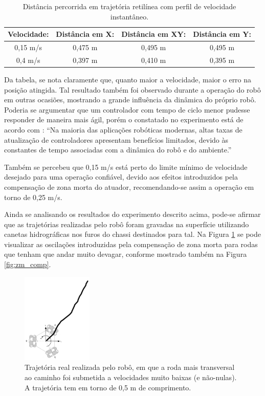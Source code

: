 \begin{table}
  \caption{Distância percorrida em trajetória retilínea com perfil de velocidade instantâneo.}
  \begin{tabular}{||c c c c||}
    \hline
     \textbf{Velocidade:} & \textbf{Distância em X:} & \textbf{Distância em XY:} & \textbf{Distância em Y:} \\ \hline\hline
     0,15 m/s        & 0,475 m    &  0,495 m     & 0,495 m    \\ \hline
     0,4 m/s         & 0,397 m    &  0,410 m     & 0,395 m    \\ \hline
  \end{tabular}
  \label{tab:spd}
\end{table}

Da tabela, se nota claramente que, quanto maior a velocidade, maior o erro na posição atingida. Tal resultado também foi observado durante a operação do robô em outras ocasiões, mostrando a grande influência da dinâmica do próprio robô. Poderia se argumentar que um controlador com tempo de ciclo menor pudesse responder de maneira mais ágil, porém o constatado no experimento está de acordo com \citet{lynch2017modern}: ``Na maioria das aplicações robóticas modernas, altas taxas de atualização de controladores apresentam benefícios limitados, devido às constantes de tempo associadas com a dinâmica do robô e do ambiente.''

Também se percebeu que 0,15 m/s está perto do limite mínimo de velocidade desejado para uma operação confiável, devido aos efeitos introduzidos pela compensação de zona morta do atuador, recomendando-se assim a operação em torno de 0,25 m/s.

Ainda se analisando os resultados do experimento descrito acima, pode-se afirmar que as trajetórias realizadas pelo robô foram gravadas na superfície utilizando canetas hidrográficas nos furos do chassi destinados para tal. Na Figura \ref{fig:ef_zm} se pode visualizar as oscilações introduzidas pela compensação de zona morta para rodas que tenham que andar muito devagar, conforme mostrado também na Figura \ref{fig:zm_comp}.

\begin{figure}[h]
  \centering
  \includegraphics[width = 0.3\textwidth]{imagens/ef_zm}
  \caption{Trajetória real realizada pelo robô, em que a roda mais transversal ao caminho foi submetida a velocidades muito baixas (e não-nulas). A trajetória tem em torno de 0,5 m de comprimento.}
  \label{fig:ef_zm}
\end{figure}

